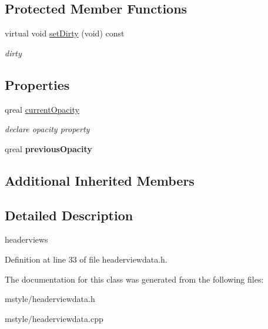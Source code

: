 \subsection*{Protected Member Functions}
\begin{DoxyCompactItemize}
\item 
\mbox{\label{class_header_view_data_ac212999384d86f6ac89125af7be20b7b}} 
virtual void \hyperlink{class_header_view_data_ac212999384d86f6ac89125af7be20b7b}{set\+Dirty} (void) const
\begin{DoxyCompactList}\small\item\em dirty \end{DoxyCompactList}\end{DoxyCompactItemize}
\subsection*{Properties}
\begin{DoxyCompactItemize}
\item 
\mbox{\label{class_header_view_data_ad6e7bb7ee1d11804ae694f3e18bb8706}} 
qreal \hyperlink{class_header_view_data_ad6e7bb7ee1d11804ae694f3e18bb8706}{current\+Opacity}
\begin{DoxyCompactList}\small\item\em declare opacity property \end{DoxyCompactList}\item 
\mbox{\label{class_header_view_data_aff222513d4daa4ff3fdf54cbbdb62a63}} 
qreal {\bfseries previous\+Opacity}
\end{DoxyCompactItemize}
\subsection*{Additional Inherited Members}


\subsection{Detailed Description}
headerviews 

Definition at line 33 of file headerviewdata.\+h.



The documentation for this class was generated from the following files\+:\begin{DoxyCompactItemize}
\item 
mstyle/headerviewdata.\+h\item 
mstyle/headerviewdata.\+cpp\end{DoxyCompactItemize}
